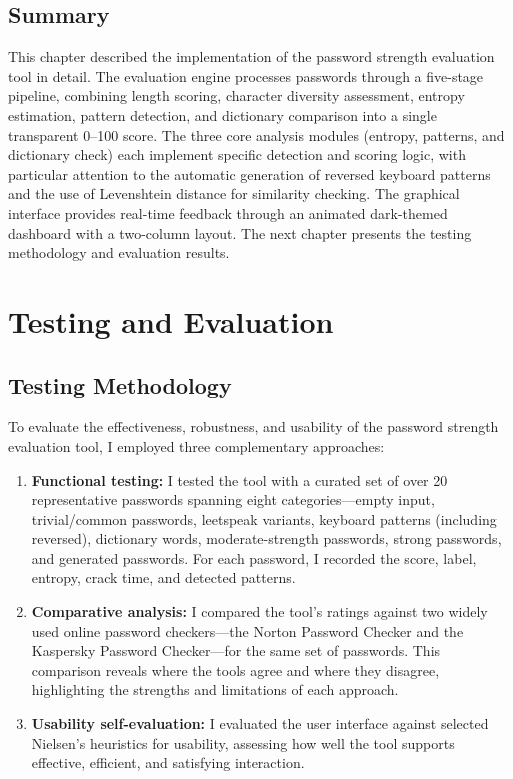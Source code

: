\section{Summary}

This chapter described the implementation of the password strength evaluation tool in detail. The evaluation engine processes passwords through a five-stage pipeline, combining length scoring, character diversity assessment, entropy estimation, pattern detection, and dictionary comparison into a single transparent 0--100 score. The three core analysis modules (entropy, patterns, and dictionary check) each implement specific detection and scoring logic, with particular attention to the automatic generation of reversed keyboard patterns and the use of Levenshtein distance for similarity checking. The graphical interface provides real-time feedback through an animated dark-themed dashboard with a two-column layout. The next chapter presents the testing methodology and evaluation results.

\chapter{Testing and Evaluation}

\section{Testing Methodology}

To evaluate the effectiveness, robustness, and usability of the password strength evaluation tool, I employed three complementary approaches:

\begin{enumerate}
    \item \textbf{Functional testing:} I tested the tool with a curated set of over 20 representative passwords spanning eight categories---empty input, trivial/common passwords, leetspeak variants, keyboard patterns (including reversed), dictionary words, moderate-strength passwords, strong passwords, and generated passwords. For each password, I recorded the score, label, entropy, crack time, and detected patterns.

    \item \textbf{Comparative analysis:} I compared the tool's ratings against two widely used online password checkers---the Norton Password Checker and the Kaspersky Password Checker---for the same set of passwords. This comparison reveals where the tools agree and where they disagree, highlighting the strengths and limitations of each approach.

    \item \textbf{Usability self-evaluation:} I evaluated the user interface against selected Nielsen's heuristics for usability, assessing how well the tool supports effective, efficient, and satisfying interaction.
\end{enumerate}


